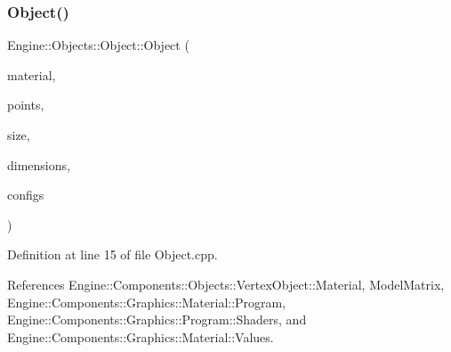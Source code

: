 \subsubsection{\texorpdfstring{Object()}{Object()}\hspace{0.1cm}{\footnotesize\ttfamily [2/2]}}
{\footnotesize\ttfamily Engine\+::\+Objects\+::\+Object\+::\+Object (\begin{DoxyParamCaption}\item[{\mbox{\hyperlink{classEngine_1_1Components_1_1Graphics_1_1Material}{Components\+::\+Graphics\+::\+Material}} $\ast$}]{material,  }\item[{const float $\ast$}]{points,  }\item[{int}]{size,  }\item[{int}]{dimensions,  }\item[{\mbox{\hyperlink{classGeneric_1_1Collection}{Generic\+::\+Collection}}$<$ \mbox{\hyperlink{structEngine_1_1Components_1_1Objects_1_1VAOConfig}{Components\+::\+Objects\+::\+V\+A\+O\+Config}} $\ast$$>$}]{configs }\end{DoxyParamCaption})}



Definition at line 15 of file Object.\+cpp.



References Engine\+::\+Components\+::\+Objects\+::\+Vertex\+Object\+::\+Material, Model\+Matrix, Engine\+::\+Components\+::\+Graphics\+::\+Material\+::\+Program, Engine\+::\+Components\+::\+Graphics\+::\+Program\+::\+Shaders, and Engine\+::\+Components\+::\+Graphics\+::\+Material\+::\+Values.


